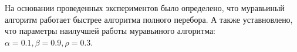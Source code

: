 \documentclass[a4paper,14pt, unknownkeysallowed]{extreport}
\begin{document}
На основании проведенных экспериментов было определено, что муравьиный алгоритм работает быстрее алгоритма полного перебора. А также уставновлено, что параметры наилучшей работы муравьиного алгоритма: $\alpha = 0.1, \beta = 0.9, \rho = 0.3$.
	

\nocite{*} 

\renewcommand\bibname{Список использованных источников} %
	
	
\end{document}
